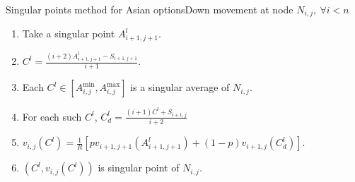 \documentclass[utf8,t,compress,xcolor=svgnames,handout]{beamer}
\begin{document}
	
	\begin{frame}{Singular points method for Asian options}{Down movement at node $ N_{i,j}, \  \forall i < n $}
		\begin{minipage}[t]{0.6\linewidth}
			\begin{enumerate}
				\item Take a singular point $ A_{i+1,j+1}^l $.
				\item $ C^l = \frac{ ( i+2) A_{i+1,j+1}^l - S_{i+1,j+1} }{ i+1 } $.
				\item Each $ C^l \in \left[ A_{i,j}^{\min}, A_{i,j}^{\max} \right] $ is a singular average of $ N_{i,j} $.
				\item For each such $ C^l $, $ C^l_d = \frac{(i+1) C^l + S_{i+1,j}}{i+2}  $
				\item $ v_{i,j}( C^l ) = \frac{1}{R} \left[ p v_{i+1,j+1} \left( A_{i+1,j+1}^l \right) + (1 - p) v_{i+1,j} \left( C^l_d \right) \right] $.
				\item $ \left( C^l, v_{i,j}( C^l ) \right) $ is singular point of $ N_{i,j} $.
			\end{enumerate}
		\end{minipage}
		\begin{minipage}[t]{0.3\linewidth}
			\begin{figure}
			\end{figure}
		\end{minipage}
	\end{frame}
	
\end{document}
